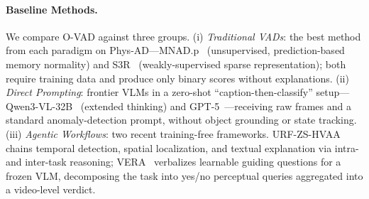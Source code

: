 \documentclass[runningheads]{llncs}
\begin{document}
\paragraph{\textbf{Baseline Methods.}}

We compare O-VAD against three groups. (i) \textit{Traditional VADs}: the best method from each paradigm on Phys-AD---MNAD.p~\cite{park2020learning} (unsupervised, prediction-based memory normality) and S3R~\cite{wu2022self} (weakly-supervised sparse representation); both require training data and produce only binary scores without explanations. (ii) \textit{Direct Prompting}: frontier VLMs in a zero-shot ``caption-then-classify'' setup---Qwen3-VL-32B~\cite{bai2025qwen3} (extended thinking) and GPT-5~\cite{singh2025openai}---receiving raw frames and a standard anomaly-detection prompt, without object grounding or state tracking. (iii) \textit{Agentic Workflows}: two recent training-free frameworks. URF-ZS-HVAA~\cite{lin2025unified} chains temporal detection, spatial localization, and textual explanation via intra- and inter-task reasoning; VERA~\cite{ye2025vera} verbalizes learnable guiding questions for a frozen VLM, decomposing the task into yes/no perceptual queries aggregated into a video-level verdict.
\end{document}
